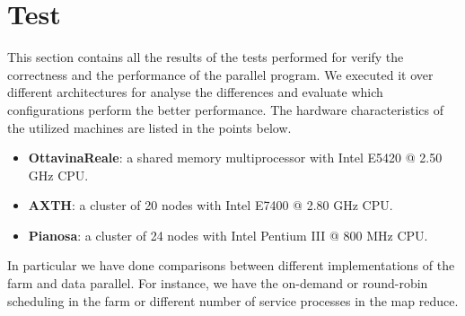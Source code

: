 \section{Test}

This section contains all the results of the tests performed for verify the correctness and the performance of the parallel program. We executed it over different architectures for analyse the differences and evaluate which configurations perform the better performance. The hardware characteristics of the utilized machines are listed in the points below. 
\begin{itemize}
\item \textbf{OttavinaReale}: a shared memory multiprocessor with Intel E5420 @ 2.50 GHz CPU.
\item \textbf{AXTH}: a cluster of 20 nodes with Intel E7400 @ 2.80 GHz CPU.
\item \textbf{Pianosa}: a cluster of 24 nodes with Intel Pentium III @ 800 MHz CPU.
\end{itemize}
In particular we have done comparisons between different implementations of the farm and data parallel. For instance, we have the on-demand or round-robin scheduling in the farm or different number of service processes in the map reduce.

